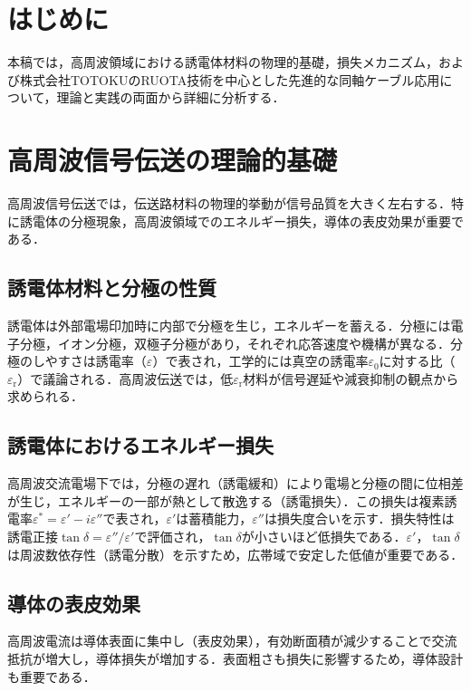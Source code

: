 \documentclass[11pt,a4paper]{ltjsarticle} %
\newcommand{\supcite}[1]{\textsuperscript{\cite{#1}}} %
\begin{document}
\section{はじめに}
本稿では，高周波領域における誘電体材料の物理的基礎，損失メカニズム，および株式会社TOTOKUのRUOTA技術を中心とした先進的な同軸ケーブル応用について，理論と実践の両面から詳細に分析する．

\section{高周波信号伝送の理論的基礎}
高周波信号伝送では，伝送路材料の物理的挙動が信号品質を大きく左右する．特に誘電体の分極現象，高周波領域でのエネルギー損失，導体の表皮効果が重要である\supcite{ref1,ref2}．

\subsection{誘電体材料と分極の性質}
誘電体は外部電場印加時に内部で分極を生じ，エネルギーを蓄える．分極には電子分極，イオン分極，双極子分極があり，それぞれ応答速度や機構が異なる\supcite{ref2}．分極のしやすさは誘電率（$\varepsilon$）で表され，工学的には真空の誘電率$\varepsilon_0$に対する比（$\varepsilon_\mathrm{r}$）で議論される．高周波伝送では，低$\varepsilon_\mathrm{r}$材料が信号遅延や減衰抑制の観点から求められる\supcite{ref3}．

\subsection{誘電体におけるエネルギー損失}
高周波交流電場下では，分極の遅れ（誘電緩和）により電場と分極の間に位相差が生じ，エネルギーの一部が熱として散逸する（誘電損失）\supcite{ref1,ref4}．この損失は複素誘電率$\varepsilon^*=\varepsilon'-i\varepsilon''$で表され，$\varepsilon'$は蓄積能力，$\varepsilon''$は損失度合いを示す．損失特性は誘電正接$\tan\delta=\varepsilon''/\varepsilon'$で評価され，$\tan\delta$が小さいほど低損失である\supcite{ref4}．$\varepsilon'$，$\tan\delta$は周波数依存性（誘電分散）を示すため，広帯域で安定した低値が重要である\supcite{ref5}．

\subsection{導体の表皮効果}
高周波電流は導体表面に集中し（表皮効果），有効断面積が減少することで交流抵抗が増大し，導体損失が増加する\supcite{ref1}．表面粗さも損失に影響するため，導体設計も重要である．
\end{document}
